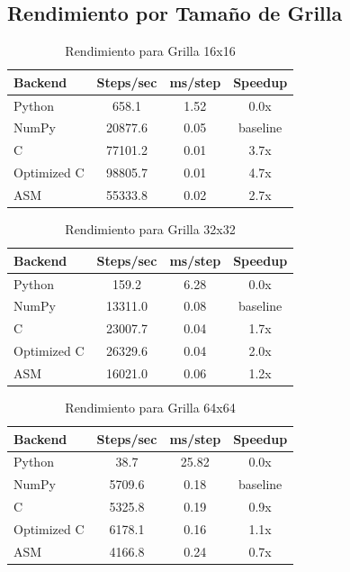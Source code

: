 \documentclass[a4paper]{article}
\begin{document}
\subsection{Rendimiento por Tamaño de Grilla}

\begin{table}[h]
\centering
\caption{Rendimiento para Grilla 16x16}
\begin{tabular}{@{}lccc@{}}
\toprule
Backend & Steps/sec & ms/step & Speedup \\
\midrule
Python & 658.1 & 1.52 & 0.0x \\
NumPy & 20877.6 & 0.05 & baseline \\
C & 77101.2 & 0.01 & 3.7x \\
Optimized C & 98805.7 & 0.01 & 4.7x \\
ASM & 55333.8 & 0.02 & 2.7x \\
\bottomrule
\end{tabular}
\label{tab:perf_16x16}
\end{table}

\begin{table}[h]
\centering
\caption{Rendimiento para Grilla 32x32}
\begin{tabular}{@{}lccc@{}}
\toprule
Backend & Steps/sec & ms/step & Speedup \\
\midrule
Python & 159.2 & 6.28 & 0.0x \\
NumPy & 13311.0 & 0.08 & baseline \\
C & 23007.7 & 0.04 & 1.7x \\
Optimized C & 26329.6 & 0.04 & 2.0x \\
ASM & 16021.0 & 0.06 & 1.2x \\
\bottomrule
\end{tabular}
\label{tab:perf_32x32}
\end{table}

\begin{table}[h]
\centering
\caption{Rendimiento para Grilla 64x64}
\begin{tabular}{@{}lccc@{}}
\toprule
Backend & Steps/sec & ms/step & Speedup \\
\midrule
Python & 38.7 & 25.82 & 0.0x \\
NumPy & 5709.6 & 0.18 & baseline \\
C & 5325.8 & 0.19 & 0.9x \\
Optimized C & 6178.1 & 0.16 & 1.1x \\
ASM & 4166.8 & 0.24 & 0.7x \\
\bottomrule
\end{tabular}
\label{tab:perf_64x64}
\end{table}
\end{document}
